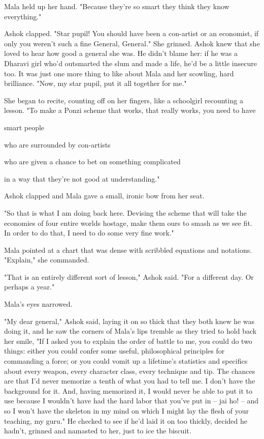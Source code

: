 Mala held up her hand. "Because they're so smart they think they
know everything."

Ashok clapped. "Star pupil! You should have been a con-artist or an
economist, if only you weren't such a fine General, General." She
grinned. Ashok knew that she loved to hear how good a general she
was. He didn't blame her: if he was a Dharavi girl who'd outsmarted
the slum and made a life, he'd be a little insecure too. It was
just one more thing to like about Mala and her scowling, hard
brilliance. "Now, my star pupil, put it all together for me."

She began to recite, counting off on her fingers, like a schoolgirl
recounting a lesson. "To make a Ponzi scheme that works, that
really works, you need to have

smart people

who are surrounded by con-artists

who are given a chance to bet on something complicated

in a way that they're not good at understanding."

Ashok clapped and Mala gave a small, ironic bow from her seat.

"So that is what I am doing back here. Devising the scheme that
will take the economies of four entire worlds hostage, make them
ours to smash as we see fit. In order to do that, I need to do some
very fine work."

Mala pointed at a chart that was dense with scribbled equations and
notations. "Explain," she commanded.

"That is an entirely different sort of lesson," Ashok said. "For a
different day. Or perhaps a year."

Mala's eyes narrowed.

"My dear general," Ashok said, laying it on so thick that they both
knew he was doing it, and he saw the corners of Mala's lips tremble
as they tried to hold back her smile, "If I asked you to explain
the order of battle to me, you could do two things: either you
could confer some useful, philosophical principles for commanding a
force; or you could vomit up a lifetime's statistics and specifics
about every weapon, every character class, every technique and tip.
The chances are that I'd never memorize a tenth of what you had to
tell me. I don't have the background for it. And, having memorized
it, I would never be able to put it to use because I wouldn't have
had the hard labor that you've put in -- jai ho! -- and so I won't
have the skeleton in my mind on which I might lay the flesh of your
teaching, my guru." He checked to see if he'd laid it on too
thickly, decided he hadn't, grinned and namasted to her, just to
ice the biscuit.

